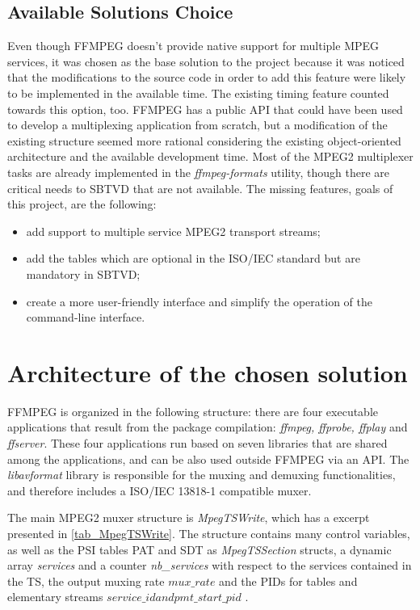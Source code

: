 \documentclass[
	12pt,				%
	openright,			%
	twoside,			%
	a4paper,			%
	brazil,
	french,				%
	english
	]{abntex2}
\begin{document}
\section{Available Solutions Choice}

Even though FFMPEG doesn't provide native support for multiple MPEG services, it was chosen as the base solution to the project because it was noticed that the modifications to the source code in order to add this feature were likely to be implemented in the available time. The existing timing feature counted towards this option, too. FFMPEG has a public API that could have been used to develop a multiplexing application from scratch, but a modification of the existing structure seemed more rational considering the existing object-oriented architecture and the available development time. Most of the MPEG2 multiplexer tasks are already implemented in the \textit{ffmpeg-formats} utility, though there are critical needs to SBTVD that are not available. The missing features, goals of this project, are the following:

\begin{itemize}
\item{add support to multiple service MPEG2 transport streams;}
\item{add the tables which are optional in the ISO/IEC standard but are mandatory in SBTVD;}
\item{create a more user-friendly interface and simplify the operation of the command-line interface.}
\end{itemize}


\chapter{Architecture of the chosen solution}

FFMPEG is organized in the following structure: there are four executable applications that result from the package compilation: \textit{ffmpeg, ffprobe, ffplay} and \textit{ffserver}. These four applications run based on seven libraries that are shared among the applications, and can be also used outside FFMPEG via an API. The \textit{libavformat} library is responsible for the muxing and demuxing functionalities, and therefore includes a ISO/IEC 13818-1 compatible muxer.

The main MPEG2 muxer structure is \textit{MpegTSWrite}, which has a excerpt presented in \ref{tab_MpegTSWrite}. The structure contains many control variables, as well as the PSI tables PAT and SDT as \textit{MpegTSSection} structs, a dynamic array \textit{services} and a counter \textit{nb\_services} with respect to the services contained in the TS, the output muxing rate \( \textit{mux\_rate} \) and the PIDs for tables and elementary streams \( \textit{service\_id} and \textit{pmt\_start\_pid} \) .
\end{document}
